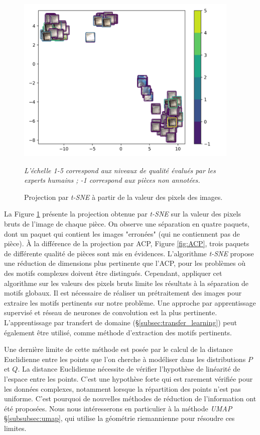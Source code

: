 \begin{figure}[htb]
	\centering
	\includegraphics[width=0.95\textwidth,height=\textheight,keepaspectratio]{../Chap4/Figures/visualize_T-SNE_pixel_space.png}
	\caption{Projection par \textit{t-SNE} à partir de la valeur des pixels des images.}
	\textit{L'échelle 1-5 correspond aux niveaux de qualité évalués par les experts humains ; -1 correspond aux pièces non annotées.}
	\label{fig:tSNE}
\end{figure}

La Figure \ref{fig:tSNE} présente la projection obtenue par \textit{t-SNE} sur la valeur des pixels bruts de l'image de chaque pièce.
On observe une séparation en quatre paquets, dont un paquet qui contient les images "erronées" (qui ne contiennent pas de pièce).
À la différence de la projection par ACP, Figure \ref{fig:ACP}, trois paquets de différente qualité de pièces sont mis en évidences.
L'algorithme \textit{t-SNE} propose une réduction de dimensions plus pertinente que l'ACP, pour les problèmes où des motifs complexes doivent être distingués.
Cependant, appliquer cet algorithme sur les valeurs des pixels bruts limite les résultats à la séparation de motifs globaux.
Il est nécessaire de réaliser un prétraitement des images pour extraire les motifs pertinents sur notre problème.
Une approche par apprentissage supervisé et réseau de neurones de convolution est la plus pertinente.
L'apprentissage par transfert de domaine (§\ref{subsec:transfer_learning}) peut également être utilisé, comme méthode d'extraction des motifs pertinents.

Une dernière limite de cette méthode est posée par le calcul de la distance Euclidienne entre les points que l'on cherche à modéliser dans les distributions $P$ et $Q$.
La distance Euclidienne nécessite de vérifier l'hypothèse de linéarité de l'espace entre les points.
C'est une hypothèse forte qui est rarement vérifiée pour les données complexes, notamment lorsque la répartition des points n'est pas uniforme.
C'est pourquoi de nouvelles méthodes de réduction de l'information ont été proposées.
Nous nous intéresserons en particulier à la méthode \textit{UMAP} §\ref{subsubsec:umap}, qui utilise la géométrie riemannienne pour résoudre ces limites.

